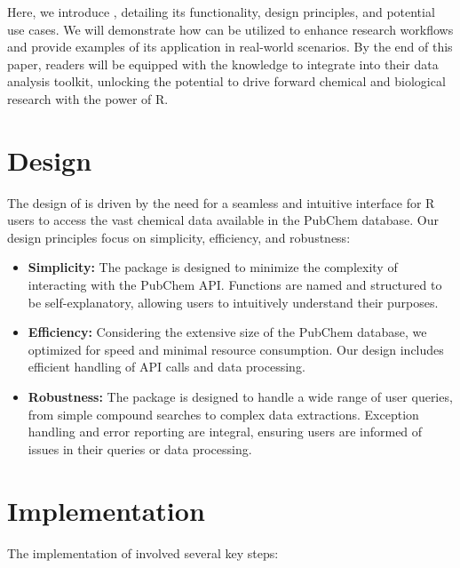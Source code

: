 Here, we introduce , detailing its functionality, design principles, and potential use cases. We will demonstrate how  can be utilized to enhance research workflows and provide examples of its application in real-world scenarios. By the end of this paper, readers will be equipped with the knowledge to integrate  into their data analysis toolkit, unlocking the potential to drive forward chemical and biological research with the power of R.

\hypertarget{design}{%
\section{Design}\label{design}}

The design of  is driven by the need for a seamless and intuitive interface for R users to access the vast chemical data available in the PubChem database. Our design principles focus on simplicity, efficiency, and robustness:

\begin{itemize}
\item
  \textbf{Simplicity:} The package is designed to minimize the complexity of interacting with the PubChem API. Functions are named and structured to be self-explanatory, allowing users to intuitively understand their purposes.
\item
  \textbf{Efficiency:} Considering the extensive size of the PubChem database, we optimized  for speed and minimal resource consumption. Our design includes efficient handling of API calls and data processing.
\item
  \textbf{Robustness:} The package is designed to handle a wide range of user queries, from simple compound searches to complex data extractions. Exception handling and error reporting are integral, ensuring users are informed of issues in their queries or data processing.
\end{itemize}

\hypertarget{implementation}{%
\section{Implementation}\label{implementation}}

The implementation of  involved several key steps:


